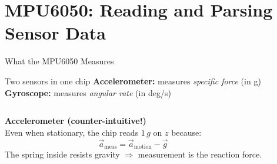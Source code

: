 \documentclass[10pt]{beamer}
\begin{document}
\section{MPU6050: Reading and Parsing Sensor Data}

\begin{frame}{What the MPU6050 Measures}
  \begin{block}{Two sensors in one chip}
    \textbf{Accelerometer:} measures \emph{specific force} (in g)\\
    \textbf{Gyroscope:} measures \emph{angular rate} (in deg/s)
  \end{block}

  \begin{columns}[T,onlytextwidth]
    \textbf{Accelerometer (counter-intuitive!)}\\
    Even when stationary, the chip reads $1\,g$ on $z$ because:
    \[
      \vec{a}_{\text{meas}} = \vec{a}_{\text{motion}} - \vec{g}
    \]
    The spring inside resists gravity $\Rightarrow$ measurement is the reaction force.

    \begin{center}
    \end{center}
  \end{columns}
\end{frame}
\end{document}

